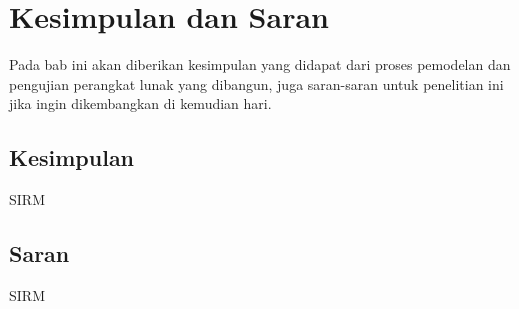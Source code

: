 \chapter{Kesimpulan dan Saran}
\label{chap:kesimpulandansaran}

Pada bab ini akan diberikan kesimpulan yang didapat dari proses pemodelan dan pengujian perangkat lunak yang dibangun, juga saran-saran untuk penelitian ini jika ingin dikembangkan di kemudian hari.

\section{Kesimpulan}
\label{sec:kesimpulan}
SIRM

\section{Saran}
\label{sec:saran}
SIRM